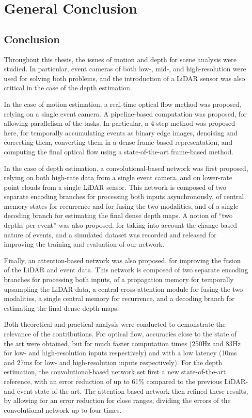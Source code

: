 \chapter{General Conclusion}\label{sec:conclusion}

\section{Conclusion}
Throughout this thesis, the issues of motion and depth for scene analysis were studied. In particular, event cameras of both low-, mid-, and high-resolution were used for solving both problems, and the introduction of a LiDAR sensor was also critical in the case of the depth estimation.

In the case of motion estimation, a real-time optical flow method was proposed, relying on a single event camera. A pipeline-based computation was proposed, for allowing parallelism of the tasks. In particular, a 4-step method was proposed here, for temporally accumulating events as binary edge images, denoising and correcting them, converting them in a dense frame-based representation, and computing the final optical flow using a state-of-the-art frame-based method.

In the case of depth estimation, a convolutional-based network was first proposed, relying on both high-rate data from a single event camera, and on lower-rate point clouds from a single LiDAR sensor. This network is composed of two separate encoding branches for processing both inputs asynchronously, of central memory states for recurrence and for fusing the two modalities, and of a single decoding branch for estimating the final dense depth maps. A notion of ``two depths per event'' was also proposed, for taking into account the change-based nature of events, and a simulated dataset was recorded and released for improving the training and evaluation of our network.

Finally, an attention-based network was also proposed, for improving the fusion of the LiDAR and event data. This network is composed of two separate encoding branches for processing both inputs, of a propagation memory for temporally upsampling the LiDAR data, a central cross-attention module for fusing the two modalities, a single central memory for recurrence, and a decoding branch for estimating the final dense depth maps.

Both theoretical and practical analysis were conducted to demonstrate the relevance of the contributions. For optical flow, accuracies close to the state of the art were obtained, but for much faster computation times (250Hz and 83Hz for low- and high-resolution inputs respectively) and with a low latency (10ms and 27ms for low- and high-resolution inputs respectively). For the depth estimation, the convolutional-based network set first a new state-of-the-art reference, with an error reduction of up to 61\% compared to the previous LiDAR-and-event state-of-the-art. The attention-based network then refined these results, by allowing for an error reduction for close ranges, dividing the errors of the convolutional network up to four times.

